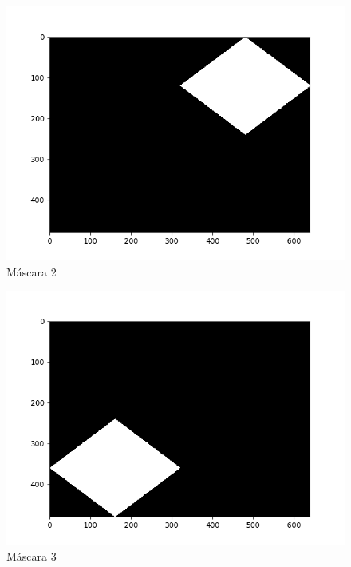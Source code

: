 	\begin{figure}[H]
		\centering
		\includegraphics[scale=0.4]{./imagenes/mask2.png}
		\caption{Máscara 2}
		\label{fig:mask2}
	\end{figure}
	
	\begin{figure}[H]
		\centering
		\includegraphics[scale=0.4]{./imagenes/mask3.png}
		\caption{Máscara 3}
		\label{fig:mask3}
	\end{figure}
	
